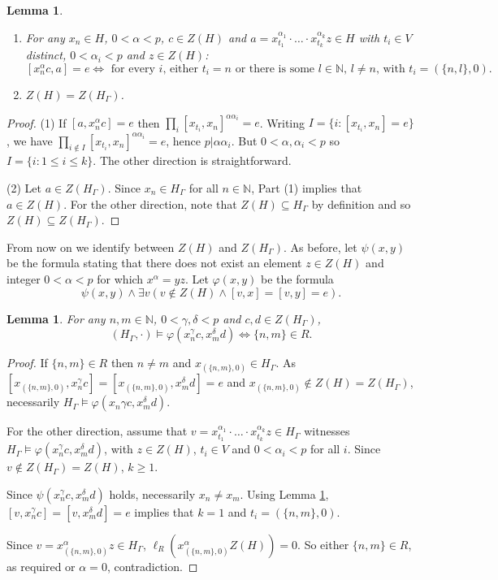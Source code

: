\documentclass[11pt]{amsart}
\theoremstyle{plain}
\newtheorem{lemma}[theorem]{Lemma}
\theoremstyle{definition}
\theoremstyle{remark}
\numberwithin{equation}{section}
\begin{document}
\begin{lemma}\label{L:auxiallry going down}
    \begin{enumerate}
        \item For any $x_n\in H$, $0<\alpha<p$, $c\in Z(H)$ and $a=x_{t_1}^{\alpha_1}\cdot\ldots\cdot x_{t_k}^{\alpha_k}z\in H$ with $t_i\in V$ distinct, $0<\alpha_i<p$ and $z\in Z(H)$: \[[x_n^\alpha c,a]=e \iff \text{ for every $i$, either $t_i=n$ or there is some $l\in \mathbb{N}$, $l\neq n$, with  $t_i=(\{n,l\},0)$}.\]
        \item $Z(H)=Z(H_\Gamma)$.
    \end{enumerate}
\end{lemma}
\begin{proof}
    (1) If $[a,x_n^\alpha c]=e$ then $\prod_i [x_{t_i},x_n]^{\alpha\alpha_i}=e$. Writing $I=\{i: [x_{t_i},x_n]=e\}$, we have $\prod_{i\notin I}[x_{t_i},x_n]^{\alpha \alpha_i}=e$, hence $p|\alpha\alpha_i$. But $0<\alpha,\alpha_i<p$ so $I=\{i: 1\leq i\leq k\}$. The other direction is straightforward.

    (2) Let $a\in Z(H_\Gamma)$. Since $x_n \in H_\Gamma$ for all $n\in \mathbb{N}$, Part (1) implies that $a\in Z(H)$. For the other direction, note that $Z(H)\subseteq H_\Gamma$ by definition and so $Z(H)\subseteq Z(H_\Gamma)$.
\end{proof}

From now on we identify between $Z(H)$ and $Z(H_\Gamma)$. As before, let  $\psi(x,y)$ be the formula stating that there does not exist an element $z\in Z(H)$ and integer $0<\alpha<p$ for which $x^\alpha=yz$.
Let $\varphi(x,y)$ be the formula \[\psi(x,y)\wedge \exists v(v\notin Z(H)\wedge [v,x]=[v,y]=e).\]

\begin{lemma}\label{L: down relation}
    For any $n,m\in \mathbb{N}$, $0<\gamma,\delta<p$ and $c,d\in Z(H_\Gamma)$, \[(H_\Gamma,\cdot)\models \varphi(x_n^\gamma c,x_m^\delta d)\iff \{n,m\}\in R.\]
\end{lemma}
\begin{proof}
    If $\{n,m\}\in R$ then $n\neq m$ and $x_{(\{n,m\},0)}\in H_\Gamma$. As $[x_{(\{n,m\},0)},x_n^\gamma c]=[x_{(\{n,m\},0)},x_m^\delta d]=e$ and $x_{(\{n,m\},0)}\notin Z(H)=Z(H_\Gamma)$, necessarily $H_\Gamma\models \varphi(x_n\gamma c,x_m^\delta d)$.

    For the other direction, assume that $v=x_{t_1}^{\alpha_1}\cdot\ldots\cdot x_{t_k}^{\alpha_k}z\in H_\Gamma$ witnesses $H_\Gamma\models \varphi(x_n^\gamma c,x_m^\delta d)$, with $z\in Z(H)$, $t_i\in V$ and $0<\alpha_i<p$ for all $i$. Since $v\notin Z(H_\Gamma)=Z(H)$, $k\geq 1$.

    Since $\psi(x_n^\gamma c, x_m^\delta d)$ holds, necessarily $x_n\neq x_m$. Using Lemma \ref{L:auxiallry going down}, $[v,x_n^\gamma c]=[v,x_m^\delta d]=e$ implies that $k=1$ and $t_i=(\{n,m\},0)$.

    Since $v=x_{(\{n,m\},0)}^{\alpha}z\in H_\Gamma$, $\ell_R(x_{(\{n,m\},0)}^{\alpha}Z(H))=0$. So either $\{n,m\}\in R$, as required or $\alpha=0$, contradiction.
\end{proof}
\end{document}
